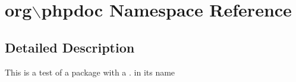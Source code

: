\hypertarget{namespaceorg_1_1phpdoc}{\section{org$\backslash$phpdoc \-Namespace \-Reference}
\label{namespaceorg_1_1phpdoc}
}


\subsection{\-Detailed \-Description}
\-This is a test of a package with a . in its name 